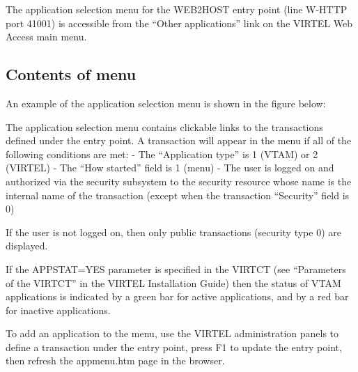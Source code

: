 \documentclass[letterpaper,10pt,english]{sphinxmanual}
\begin{document}
\begin{sphinxVerbatim}[commandchars=\\\{\}]
\end{sphinxVerbatim}

The application selection menu for the WEB2HOST entry point (line W-HTTP port 41001) is accessible from the “Other applications” link on the VIRTEL Web Access main menu.


\subsection{Contents of menu}
\label{\detokenize{User_Guide:contents-of-menu}}
An example of the application selection menu is shown in the figure below:

 

The application selection menu contains clickable links to the transactions defined under the entry point. A transaction will appear in the menu if all of the following conditions are met:
- The “Application type” is 1 (VTAM) or 2 (VIRTEL)
- The “How started” field is 1 (menu)
- The user is logged on and authorized via the security subsystem to the security resource whose name is the internal name of the transaction (except when the transaction “Security” field is 0)

If the user is not logged on, then only public transactions (security type 0) are displayed.

If the APPSTAT=YES parameter is specified in the VIRTCT (see “Parameters of the VIRTCT” in the VIRTEL Installation
Guide) then the status of VTAM applications is indicated by a green bar for active applications, and by a red bar for
inactive applications.

To add an application to the menu, use the VIRTEL administration panels to define a transaction under the entry point,
press F1 to update the entry point, then refresh the appmenu.htm page in the browser.
\end{document}
